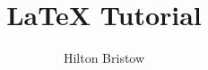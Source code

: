 \documentclass[11pt,a4paper]{book}
\begin{document}
\author{Hilton Bristow}
\title{\Large{\textbf{LaTeX Tutorial}}}

\maketitle

\end{document}
